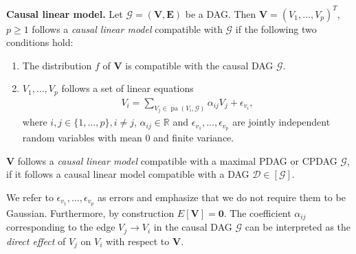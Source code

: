 \documentclass[11pt,a4paper]{article}
\theoremstyle{definition}
\theoremstyle{remark}
\DeclareMathOperator{\pa}{pa}
\newcommand{\mpdag}{maximal PDAG}
\newcommand{\g}[1][G]{\mathcal{#1}}
\newcommand{\vsp}{\vspace{.2cm}}
\begin{document}
\vsp\noindent\textbf{Causal linear model.} 
Let $\g = (\mathbf{V,E})$ be a DAG. 
Then $\mathbf{V} =(V_1, \dots, V_p)^T$, $p\ge1$ follows a \textit{causal linear model} compatible with $\g$ if the following two conditions hold:
\begin{enumerate}
	\item The distribution $f$ of $\mathbf{V}$ is compatible with the causal DAG $\g$.
	\item $V_1, \dots, V_p$ follows a set of linear equations
	\begin{align}
	V_i = \sum_{V_j \in \pa(V_i,\g)} \alpha_{ij}V_j +\epsilon_{v_i}, \label{sem}
	\end{align}
	where $i,j \in \{1,\dots,p\}, i \neq j$,  $\alpha_{ij} \in \mathbb{R}$ and $\epsilon_{v_1}, \dots, \epsilon_{v_p}$ are jointly independent random variables with mean 0 and finite variance. 
\end{enumerate}
$\mathbf{V}$ follows a \textit{causal linear model} compatible with a \mpdag{} or CPDAG $\g$, if it follows a causal linear model compatible with a DAG $\g[D] \in [\g]$.

We refer to $\epsilon_{v_1}, \dots, \epsilon_{v_p}$ as errors and emphasize that we do not require them to be Gaussian. Furthermore, by  construction $E[\mathbf{V}] = \boldsymbol{0}$. The coefficient $\alpha_{ij}$ corresponding to the edge $V_j \rightarrow V_i$ in the causal DAG $\g$ can be interpreted as the \textit{direct effect} of $V_j$ on $V_i$ with respect to $\mathbf{V}$. 

\end{document}
